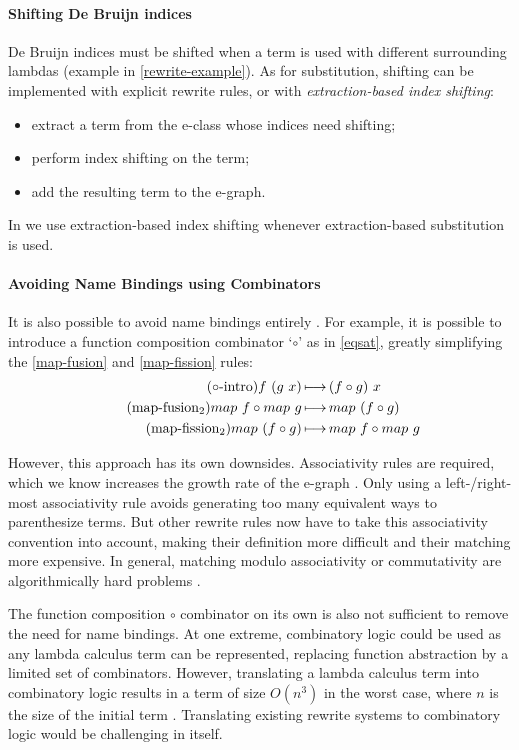 \paragraph{Shifting De Bruijn indices}
De Bruijn indices must be shifted when a term is used with different surrounding lambdas (example in \cref{rewrite-example}).
As for substitution, shifting can be implemented with explicit rewrite rules, or with \emph{extraction-based index shifting}:
\begin{itemize}
    \item extract a term from the e-class whose indices need shifting;
    \item perform index shifting on the term;
    \item add the resulting term to the e-graph.
\end{itemize}
In \kles{} we use extraction-based index shifting whenever extraction-based substitution is used.

\paragraph{Avoiding Name Bindings using Combinators}
It is also possible to avoid name bindings entirely \cite{smith2021-access-patterns}.
For example, it is possible to introduce a function composition combinator `$\circ$' as in \cref{eqsat}, greatly simplifying the \ref{map-fusion} and \ref{map-fission} rules:
\begin{align}
    \tag{$\circ$-intro}
    f~(g~x) &\operatorname{\longmapsto}{} (f \circ g)~x \\
    \tag{map-fusion$_2$}
    map~f \circ map~g &\operatorname{\longmapsto}{} map~(f \circ g) \\
    \tag{map-fission$_2$}
    map~(f \circ g) &\operatorname{\longmapsto}{} map~f \circ map~g
\end{align}

However, this approach has its own downsides.
Associativity rules are required, which we know increases the growth rate of the e-graph \cite{willsey2021-egg}.
Only using a left-/right-most associativity rule avoids generating too many equivalent ways to parenthesize terms.
But other rewrite rules now have to take this associativity convention into account, making their definition more difficult and their matching more expensive.
In general, matching modulo associativity or commutativity are algorithmically hard problems \cite{benanav1987-complexity-matching}.

The function composition $\circ$ combinator on its own is also not sufficient to remove the need for name bindings.
At one extreme, combinatory logic could be used as any lambda calculus term can be represented, replacing function abstraction by a limited set of combinators.
However, translating a lambda calculus term into combinatory logic results in a term of size $O(n^3)$ in the worst case, where $n$ is the size of the initial term \cite{lachowski2018-complexity}.
Translating existing rewrite systems to combinatory logic would be challenging in itself.

